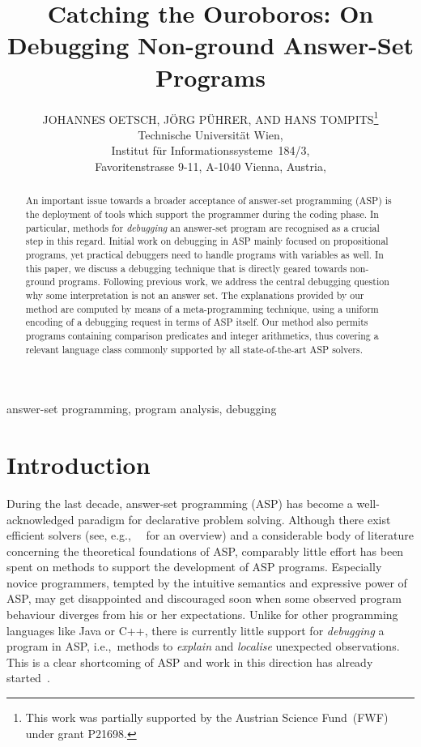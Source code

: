 \documentclass{tlp}
\title[Catching the Ouroboros: On Debugging Non-ground Answer-Set Programs]{Catching the Ouroboros: On Debugging Non-ground Answer-Set Programs}
\author[J. Oetsch, J. P\"uhrer, and H. Tompits]{JOHANNES OETSCH, J\"ORG P\"UHRER, AND HANS TOMPITS\thanks{This work was partially supported by the Austrian Science Fund~(FWF) under grant P21698.} \\ 
Technische Universit\"at Wien,\\
Institut f\"ur Informationssysteme~184/3,\\
Favoritenstrasse 9-11, A-1040 Vienna,
Austria,\\
\email{\{oetsch,puehrer,tompits\}@kr.tuwien.ac.at}}
\newcommand{\iec}{i.e.,\ }
\newcommand{\egc}{e.g.,\ }
\begin{document}
\label{firstpage}


\maketitle



\begin{abstract}
An important issue towards a broader acceptance of answer-set programming (ASP) is the deployment of tools which support the programmer during the coding phase. In particular, methods for \emph{debugging} an answer-set program are recognised as a crucial step in this regard. Initial work on debugging in ASP mainly focused on propositional programs, yet practical debuggers need to handle programs with variables as well. In this paper, we discuss a debugging technique that is directly geared towards non-ground programs. Following previous work, we address the central debugging question why some interpretation is not an answer set. The explanations provided by our method are computed by means of a meta-programming technique, using a uniform encoding of a debugging request in terms of ASP itself. Our method also permits programs containing comparison predicates and integer arithmetics, thus covering a relevant language class commonly supported by all state-of-the-art ASP solvers.
 \end{abstract}

\begin{keywords}
answer-set programming, program analysis, debugging
\end{keywords}

\section{Introduction}

During the last decade, answer-set programming (ASP) has become a well-acknowledged paradigm for 
declarative problem solving. 
Although there exist efficient solvers (see, \egc {}~\citeyear{competition09} for an overview) and  a considerable body of literature 
concerning the theoretical foundations of ASP,
 comparably little effort has been spent
on methods to support the development of ASP programs.
Especially novice  programmers, tempted by the intuitive semantics and expressive power of 
ASP, may get disappointed and discouraged soon when
some observed program behaviour diverges from his or her expectations. 
Unlike for other programming languages like Java or C++, there is currently little support for \emph{debugging} a program
 in ASP, \iec  methods to \emph{explain} and \emph{localise} unexpected observations. This  is a clear  shortcoming of ASP and work in this direction has already started~\cite{brain05,syrjaenen06,brain07,mirek07,CaballeroGS08,gebser08,pontelli09,WittocxVD09}.
\end{document}
